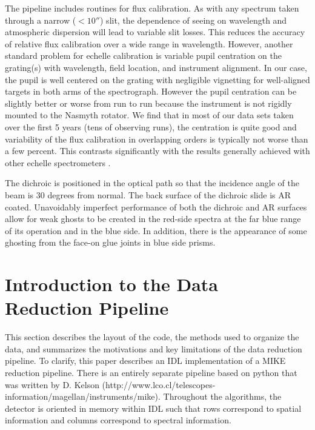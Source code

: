 \documentclass[]{emulateapj}
\begin{document}
The pipeline includes routines for flux calibration.  As with any
spectrum taken through a narrow ($<10''$) slit, the dependence of
seeing on wavelength and atmospheric dispersion
will lead to variable slit losses.  This reduces
the accuracy of relative flux calibration over a wide range in
wavelength. However, another standard problem for echelle calibration
is variable pupil centration on the grating(s) with wavelength, field
location, and instrument alignment.  In our case, the pupil is well
centered on the grating with negligible vignetting for well-aligned
targets in both arms of the spectrograph.  However the pupil
centration can be slightly better or worse from run to run because the
instrument is not rigidly mounted to the Nasmyth rotator.  We find
that in most of our data sets taken over the first 5 years (tens of
observing runs), the centration is quite good and variability of the
flux calibration in overlapping orders is typically not worse than a
few percent.
This contrasts significantly with the results generally achieved
with other echelle spectrometers \citep[e.g.\ Keck/HIRES][]{suzuki}.

The dichroic is positioned in the optical path so that the incidence
angle of the beam is 30 degrees from normal.  The back surface of the
dichroic slide is AR coated. Unavoidably imperfect performance of both
the dichroic and AR surfaces allow for weak ghosts to be created in
the red-side spectra at the far blue range of its operation and in the
blue side.  In addition, there is the appearance of some ghosting from 
the face-on glue joints in blue side prisms.


\section{Introduction to the Data Reduction Pipeline}
\label{sec:pipe}

This section describes the layout of the code, the methods
used to organize the data, and summarizes the motivations and 
key limitations of the data reduction pipeline.
To clarify, this paper describes an IDL implementation of
a MIKE reduction pipeline.  There is an entirely separate pipeline
based on python that was written by D. Kelson 
(http://www.lco.cl/telescopes-information/magellan/instruments/mike).
Throughout the algorithms, the detector is oriented in memory 
within IDL such that rows correspond to spatial information and columns
correspond to spectral information.
\end{document}
